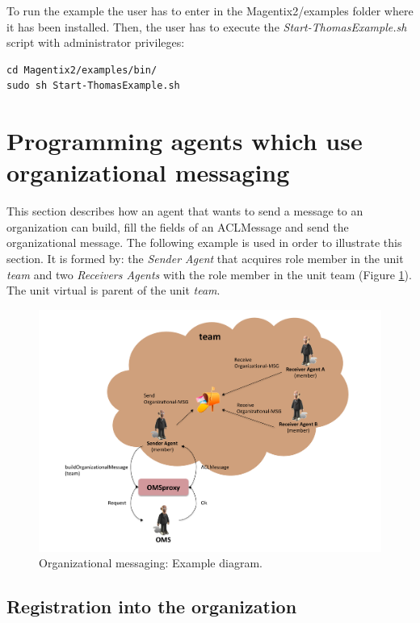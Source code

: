To run the example the user has to enter in the Magentix2/examples folder where it has been installed. Then, the user has to execute the \textit{Start-ThomasExample.sh} script with administrator privileges:

\begin{lstlisting}
cd Magentix2/examples/bin/
sudo sh Start-ThomasExample.sh
\end{lstlisting}


\section{Programming agents which use organizational messaging}



This section describes how an agent that wants to send a message to an organization
can build, fill the fields of an ACLMessage and send the organizational message.
The following example is used in order to illustrate this section. It is formed by: the \textit{Sender Agent} that acquires role member in the unit \textit{team} and two \textit{Receivers Agents} with the role member in the unit team (Figure \ref{fig:org1}). The unit virtual is parent of the unit \textit{team}.

\begin{figure}[h!t]
	\centering
	\includegraphics[width=1\textwidth]{Thomas/images/org.pdf}
	\caption{Organizational messaging: Example diagram.}
	\label{fig:org1}
\end{figure}


\subsection{Registration into the organization}


